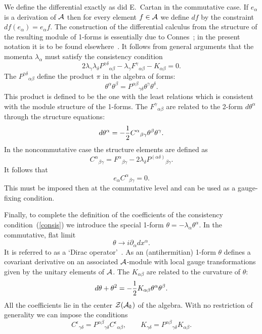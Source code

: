 \documentclass[12pt,a4paper]{article}
\newcounter{eg}
\def\c#1{{\cal #1}}
\def\kbar{{\mathchar'26\mkern-9muk}}
\def\cn#1{\cite{#1}}
\begin{document}
We define the differential exactly as did E.~Cartan in the commutative
case. If $e_\alpha$ is a derivation of $\c{A}$ then for every element 
$f \in \c{A}$ we define $df$ by the constraint 
$df(e_\alpha) = e_\alpha f$. The construction of the differential
calculus from the structure of the resulting module of 1-forms is
essentially due to Connes~\cite{Con94}; in the present notation it is
to be found elsewhere~\cite{Mad00c}.  It follows from general
arguments that the momenta $\lambda_\alpha$ must satisfy the
consistency condition~\cn{DimMad96,MadMou98}
\begin{equation}
2 \lambda_\gamma \lambda_\delta P^{\gamma\delta}{}_{\alpha\beta} - 
\lambda_\gamma F^\gamma{}_{\alpha\beta} - 
K_{\alpha\beta} = 0.                                           \label{consis}
\end{equation}
The $P^{\gamma\delta}{}_{\alpha\beta}$ define the product $\pi$ in the
algebra of forms:
\begin{equation}
\theta^\alpha \theta^\beta = P^{\alpha\beta}{}_{\gamma\delta} 
\theta^\gamma \theta^\delta.                                  \label{struc}
\end{equation}
This product is defined to be the one with the least relations which
is consistent with the module structure of the 1-forms.  The
$F^\gamma{}_{\alpha\beta}$ are related to the 2-form $d\theta^\alpha$
through the structure equations:
$$
d\theta^\alpha = - {1\over 2}C^\alpha{}_{\beta\gamma} 
\theta^\beta \theta^\gamma.
$$
In the noncommutative case the structure elements are defined as
\begin{equation}
C^\alpha{}_{\beta\gamma} = F^\alpha{}_{\beta\gamma} - 
2 \lambda_\delta P^{(\alpha\delta)}{}_{\beta\gamma}.              \label{s-e}
\end{equation}
It follows that
\begin{equation}
e_\alpha C^\alpha{}_{\beta\gamma} = 0.                           \label{fix}
\end{equation}
This must be imposed then at the commutative level and can be used as a 
gauge-fixing condition. 

Finally, to complete the definition of the coefficients of the
consistency condition~(\ref{consis}) we introduce the special 1-form 
$\theta = -\lambda_\alpha\theta^\alpha$. In the commutative, flat limit
$$
\theta \rightarrow i\partial_\alpha dx^\alpha.
$$
It is referred to as a `Dirac operator'~\cite{Con94}. As an
(antihermitian) 1-form $\theta$ defines a covariant derivative on an
associated $\c{A}$-module with local gauge transformations given by
the unitary elements of $\c{A}$.  The $K_{\alpha\beta}$ are related to
the curvature of $\theta$:
$$
d\theta + \theta^2 = - {1\over 2} K_{\alpha\beta} \theta^\alpha \theta^\beta.
$$
All the coefficients lie in the center $\c{Z}(\c{A}_\kbar)$ of the algebra.
With no restriction of generality we can impose the conditions
\begin{equation}
C^\epsilon{}_{\gamma\delta} = 
P^{\alpha\beta}{}_{\gamma\delta} C^\epsilon{}_{\alpha\beta}, \qquad 
K_{\gamma\delta} = 
P^{\alpha\beta}{}_{\gamma\delta} K_{\alpha\beta}.              \label{C-con}
\end{equation}
\end{document}
